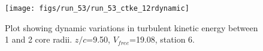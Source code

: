 \begin{figure}[H]
\centering
\texttt{[image: figs/run\_53/run\_53\_ctke\_12rdynamic]}
\caption{Plot showing dynamic variations in turbulent kinetic energy between 1 and 2 core radii. $z/c$=9.50, $V_{free}$=19.08, station 6.}
\label{fig:run_53_ctke_12rdynamic}
\end{figure}


